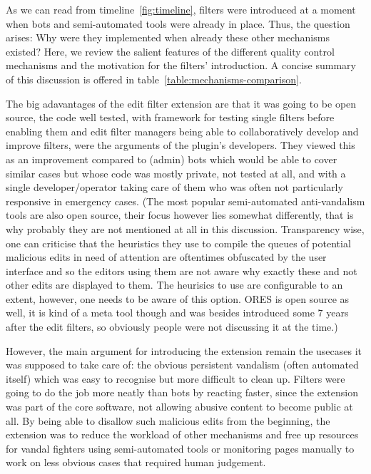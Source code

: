 As we can read from timeline~\ref{fig:timeline}, filters were introduced at a moment when bots and semi-automated tools were already in place.
Thus, the question arises: Why were they implemented when already these other mechanisms existed?
Here, we review the salient features of the different quality control mechanisms and the motivation for the filters' introduction.
A concise summary of this discussion is offered in table~\ref{table:mechanisms-comparison}.

The big adavantages of the edit filter extension are that it was going to be open source, the code well tested, with framework for testing single filters before enabling them and edit filter managers being able to collaboratively develop and improve filters, were the arguments of the plugin's developers.
They viewed this as an improvement compared to (admin) bots which would be able to cover similar cases but whose code was mostly private, not tested at all, and with a single developer/operator taking care of them who was often not particularly responsive in emergency cases.
(The most popular semi-automated anti-vandalism tools are also open source, their focus however lies somewhat differently, that is why probably they are not mentioned at all in this discussion.
Transparency wise, one can criticise that the heuristics they use to compile the queues of potential malicious edits in need of attention are oftentimes obfuscated by the user interface and so the editors using them are not aware why exactly these and not other edits are displayed to them.
The heurisics to use are configurable to an extent, however, one needs to be aware of this option. %
ORES is open source as well, it is kind of a meta tool though and was besides introduced some 7 years after the edit filters, so obviously people were not discussing it at the time.)

However, the main argument for introducing the extension remain the usecases it was supposed to take care of: the obvious persistent vandalism (often automated itself) which was easy to recognise but more difficult to clean up.
Filters were going to do the job more neatly than bots by reacting faster, since the extension was part of the core software, %
not allowing abusive content to become public at all.
By being able to disallow such malicious edits from the beginning, the extension was to reduce the workload of other mechanisms and free up resources for vandal fighters using semi-automated tools or monitoring pages manually to work on less obvious cases that required human judgement.

